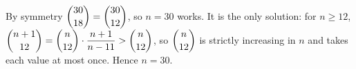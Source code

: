 By symmetry $\dbinom{30}{18}=\dbinom{30}{12}$, so $n=30$ works. It is the only solution: for $n\ge12$, $\dbinom{n+1}{12}=\dbinom n{12}\cdot\dfrac{n+1}{n-11}>\dbinom n{12}$, so $\dbinom n{12}$ is strictly increasing in $n$ and takes each value at most once. Hence $n=\boxed{30}$.
